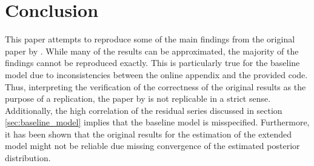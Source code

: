 \section{Conclusion}
\label{sec:conclusion}

This paper attempts to reproduce some of the main findings from the original paper by \citeauthor{JERMANNfinancial}. While many of the results can be approximated, the majority of the findings cannot be reproduced exactly. This is particularly true for the baseline model due to inconsistencies between the online appendix and the provided code. Thus, interpreting the verification of the correctness of the original results as the purpose of a replication, the paper by \citeauthor{JERMANNfinancial} is not replicable in a strict sense. Additionally, the high correlation of the residual series discussed in section \ref{sec:baseline_model} implies that the baseline model is misspecified. Furthermore, it has been shown that the original results for the estimation of the extended model might not be reliable due missing convergence of the estimated posterior distribution.
